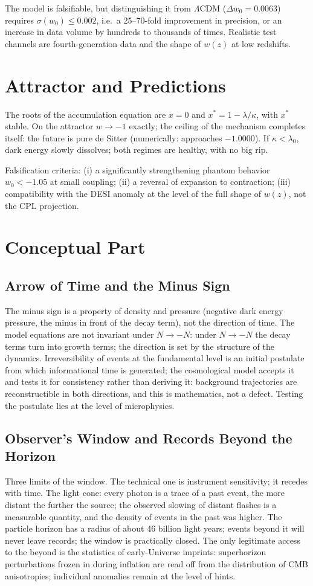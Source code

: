 \documentclass[11pt,a4paper]{article}
\begin{document}
The model is falsifiable, but distinguishing it from $\Lambda$CDM ($\Delta w_0=0.0063$) requires $\sigma(w_0)\le0.002$, i.e.\ a 25--70-fold improvement in precision, or an increase in data volume by hundreds to thousands of times. Realistic test channels are fourth-generation data and the shape of $w(z)$ at low redshifts.

\section{Attractor and Predictions}
The roots of the accumulation equation are $x=0$ and $x^*=1-\lambda/\kappa$, with $x^*$ stable. On the attractor $w\to-1$ exactly; the ceiling of the mechanism completes itself: the future is pure de Sitter (numerically: approaches $-1.0000$). If $\kappa<\lambda_0$, dark energy slowly dissolves; both regimes are healthy, with no big rip.

Falsification criteria: (i) a significantly strengthening phantom behavior $w_0<-1.05$ at small coupling; (ii) a reversal of expansion to contraction; (iii) compatibility with the DESI anomaly at the level of the full shape of $w(z)$, not the CPL projection.

\section{Conceptual Part}

\subsection{Arrow of Time and the Minus Sign}
The minus sign is a property of density and pressure (negative dark energy pressure, the minus in front of the decay term), not the direction of time. The model equations are not invariant under $N\to-N$: under $N\to-N$ the decay terms turn into growth terms; the direction is set by the structure of the dynamics. Irreversibility of events at the fundamental level is an initial postulate from which informational time is generated; the cosmological model accepts it and tests it for consistency rather than deriving it: background trajectories are reconstructible in both directions, and this is mathematics, not a defect. Testing the postulate lies at the level of microphysics.

\subsection{Observer's Window and Records Beyond the Horizon}
Three limits of the window. The technical one is instrument sensitivity; it recedes with time. The light cone: every photon is a trace of a past event, the more distant the further the source; the observed slowing of distant flashes is a measurable quantity, and the density of events in the past was higher. The particle horizon has a radius of about 46 billion light years; events beyond it will never leave records; the window is practically closed. The only legitimate access to the beyond is the statistics of early-Universe imprints: superhorizon perturbations frozen in during inflation are read off from the distribution of CMB anisotropies; individual anomalies remain at the level of hints.
\end{document}
